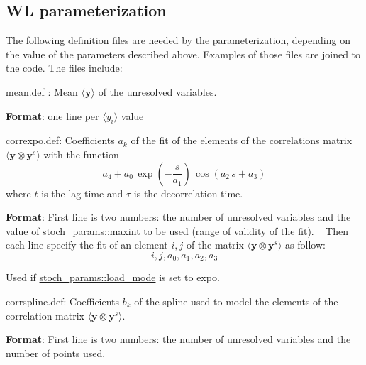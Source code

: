 \subsection*{WL parameterization}

The following definition files are needed by the parameterization, depending on the value of the parameters described above. Examples of those files are joined to the code. The files include\+:
\begin{DoxyItemize}
\item \textquotesingle{}mean.\+def\textquotesingle{} \+: Mean $\langle \boldsymbol y \rangle$ of the unresolved variables.
\begin{DoxyItemize}
\item {\bfseries Format}\+: one line per $\langle y_i \rangle$ value
\end{DoxyItemize}
\item \textquotesingle{}correxpo.\+def\textquotesingle{}\+: Coefficients $a_k$ of the fit of the elements of the correlations matrix $\langle \boldsymbol y \otimes \boldsymbol y^s \rangle$ with the function \[ a_4+a_0 \, \exp\left(-\frac{s}{a_1}\right) \, \cos(a_2 \, s + a_3) \] where $t$ is the lag-\/time and $\tau$ is the decorrelation time.
\begin{DoxyItemize}
\item {\bfseries Format}\+: First line is two numbers\+: the number of unresolved variables and the value of \hyperlink{namespacestoch__params_a50976593e79387f25e08fef6ce56b30b}{stoch\+\_\+params\+::maxint} to be used (range of validity of the fit). ~\newline
 Then each line specify the fit of an element $i,j$ of the matrix $\langle \boldsymbol y \otimes \boldsymbol y^s \rangle$ as follow\+: \[ i,j,a_0,a_1,a_2,a_3\]
\item Used if \hyperlink{namespacestoch__params_ac61a48744a1bb015b5148c421837fbe7}{stoch\+\_\+params\+::load\+\_\+mode} is set to \textquotesingle{}expo\textquotesingle{}.
\end{DoxyItemize}
\item \textquotesingle{}corrspline.\+def\textquotesingle{}\+: Coefficients $b_k$ of the spline used to model the elements of the correlation matrix $\langle \boldsymbol y \otimes \boldsymbol y^s \rangle$.
\begin{DoxyItemize}
\item {\bfseries Format}\+: First line is two numbers\+: the number of unresolved variables and the number of points used. ~\newline

\end{DoxyItemize}
\end{DoxyItemize}
